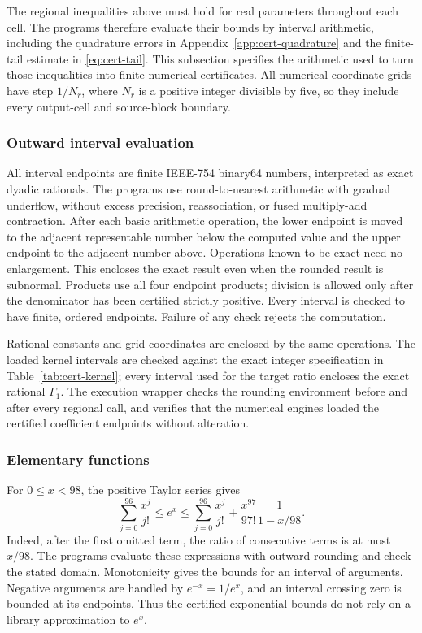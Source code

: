 \documentclass[11pt]{article}
\theoremstyle{definition}
\theoremstyle{remark}
\begin{document}
The regional inequalities above must hold for real parameters throughout
each cell.  The programs therefore evaluate their bounds by interval
arithmetic, including the quadrature errors in
Appendix~\ref{app:cert-quadrature} and the finite-tail estimate in
\eqref{eq:cert-tail}.  This subsection specifies the arithmetic used to
turn those inequalities into finite numerical certificates.
All numerical coordinate grids have step $1/N_r$, where $N_r$ is a
positive integer divisible by five, so they include every output-cell
and source-block boundary.

\subsubsection{Outward interval evaluation}

All interval endpoints are finite IEEE-754 binary64 numbers, interpreted
as exact dyadic rationals.  The programs use round-to-nearest arithmetic
with gradual underflow, without excess precision, reassociation, or
fused multiply-add contraction.  After each basic arithmetic operation,
the lower endpoint is moved to the adjacent representable number below
the computed value and the upper endpoint to the adjacent number above.
Operations known to be exact need no enlargement.  This encloses the exact
result even when the rounded result is subnormal.  Products use all four
endpoint products; division is allowed only after the denominator has
been certified strictly positive.  Every interval is checked to have
finite, ordered endpoints.  Failure of any check rejects the computation.

Rational constants and grid coordinates are enclosed by the same
operations.  The loaded kernel intervals are checked against the exact
integer specification in Table~\ref{tab:cert-kernel}; every interval
used for the target ratio encloses the exact rational
$\Gamma_1$.  The execution wrapper checks the rounding environment
before and after every regional call, and verifies that the numerical
engines loaded the certified coefficient endpoints without alteration.

\subsubsection{Elementary functions}

For $0\le x<98$, the positive Taylor series gives
\begin{equation}\label{eq:cert-exp-arithmetic}
 \sum_{j=0}^{96}\frac{x^j}{j!}
 \le e^x
 \le \sum_{j=0}^{96}\frac{x^j}{j!}
       +\frac{x^{97}}{97!}\frac1{1-x/98}.
\end{equation}
Indeed, after the first omitted term, the ratio of consecutive terms
is at most $x/98$.  The programs evaluate these expressions with
outward rounding and check the stated domain.  Monotonicity gives the
bounds for an interval of arguments.  Negative arguments are handled by
$e^{-x}=1/e^x$, and an interval crossing zero is bounded at its endpoints.
Thus the certified exponential bounds do not rely on a library
approximation to $e^x$.
\end{document}
